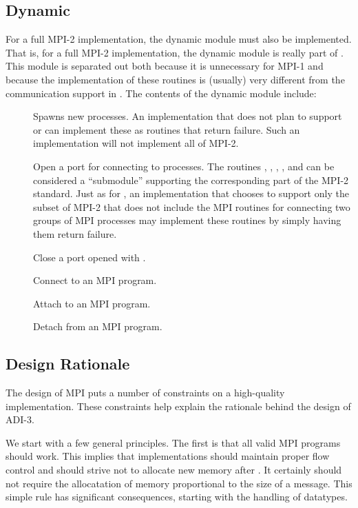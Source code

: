 \documentclass{article}
\begin{document}
\subsection{Dynamic}
For a full MPI-2 implementation, the dynamic module must also be
implemented.  That is, for a full MPI-2 implementation, the dynamic
module is really part of .  This module is separated
out both because it is unnecessary for MPI-1 and because the
implementation of these routines is (usually) very different from the
communication support in .  The contents of the
dynamic module include:

\begin{description}
\item[]Spawns new processes.  An implementation
  that does not plan to support  or
   can implement these as routines that return
  failure.  Such an implementation will not implement all of MPI-2.
\item[]Open a port for connecting to processes.  The
  routines , ,
  , , and
   can be considered a 
  ``submodule'' supporting the corresponding part of the MPI-2 standard.  Just
  as for , an implementation that chooses to
  support only the subset of MPI-2 that does not include the MPI routines for
  connecting two groups of MPI processes may implement these routines by
  simply having them return failure.
\item[]Close a port opened with .
\item[]Connect to an MPI program.
\item[]Attach to an MPI program.
\item[]Detach from an MPI program.
\end{description}

\subsection{Design Rationale}
\label{sec-intermediate}
The design of MPI puts a number of constraints on a high-quality
implementation.  These constraints help explain the rationale behind
the design of ADI-3.

We start with a few general principles.  The first is that all valid
MPI programs should work.  This implies that implementations should
maintain proper flow control and should strive not to allocate new
memory after .  It certainly should not require
the allocatation of memory proportional to the size of a message.
This simple rule has significant consequences, starting with the
handling of datatypes.
\end{document}
